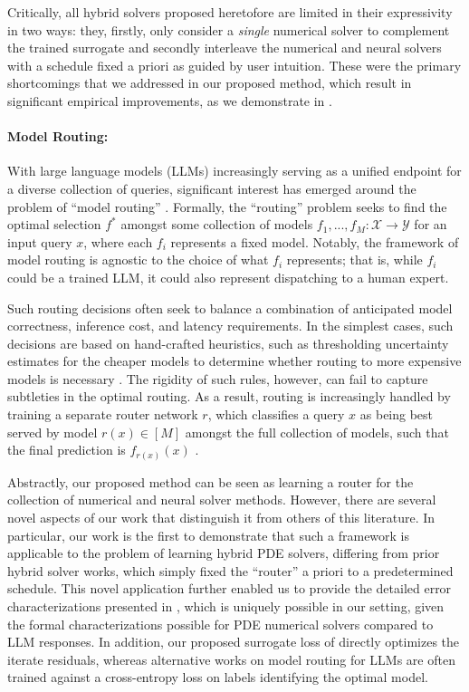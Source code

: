 \documentclass{article} %
\begin{document}
Critically, all hybrid solvers proposed heretofore are limited in their expressivity in two ways: they, firstly, only consider a \textit{single} numerical solver to complement the trained surrogate and secondly interleave the numerical and neural solvers with a schedule fixed a priori as guided by user intuition. These were the primary shortcomings that we addressed in our proposed method, which result in significant empirical improvements, as we demonstrate in .

\paragraph{Model Routing:}
With large language models (LLMs) increasingly serving as a unified endpoint for a diverse collection of queries, significant interest has emerged around the problem of ``model routing'' \cite{shnitzer2023large,hu2024routerbench,ding2024hybrid,huang2025routereval}. Formally, the ``routing'' problem seeks to find the optimal selection $f^{*}$ amongst some collection of models $f_{1},...,f_{M} : \mathcal{X}\to\mathcal{Y}$ for an input query $x$, where each $f_i$ represents a fixed model. Notably, the framework of model routing is agnostic to the choice of what $f_i$ represents; that is, while $f_i$ could be a trained LLM, it could also represent dispatching to a human expert.

Such routing decisions often seek to balance a combination of anticipated model correctness, inference cost, and latency requirements. In the simplest cases, such decisions are based on hand-crafted heuristics, such as thresholding uncertainty estimates for the cheaper models to determine whether routing to more expensive models is necessary \cite{chuang2025confident,chuang2024learning}. The rigidity of such rules, however, can fail to capture subtleties in the optimal routing. As a result, routing is increasingly handled by training a separate router network $r$, which classifies a query $x$ as being best served by model $r(x)\in[M]$ amongst the full collection of models, such that the final prediction is $f_{r(x)}(x)$ \cite{mohammadshahi2024routoo,hari2023tryage,vsakota2024fly}.

Abstractly, our proposed method can be seen as learning a router for the collection of numerical and neural solver methods. However, there are several novel aspects of our work that distinguish it from others of this literature. In particular, our work is the first to demonstrate that such a framework is applicable to the problem of learning hybrid PDE solvers, differing from prior hybrid solver works, which simply fixed the ``router'' a priori to a predetermined schedule. This novel application further enabled us to provide the detailed error characterizations presented in , which is uniquely possible in our setting, given the formal characterizations possible for PDE numerical solvers compared to LLM responses. In addition, our proposed surrogate loss of  directly optimizes the iterate residuals, whereas alternative works on model routing for LLMs are often trained against a cross-entropy loss on labels identifying the optimal model.
\end{document}
